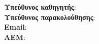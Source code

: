 \begin{titlepage}
    \vspace{1em}
    \hspace{4ex}
    \begin{minipage}[t]{0.8\textwidth} 
        \raggedright
        \textbf{Υπεύθυνος καθηγητής}: \advisor\\
        \textbf{Υπεύθυνος παρακολούθησης}: \advisorView\\
        \textbf{Email}: \mailauthor\\
        \textbf{ΑΕΜ}: \aem
    \end{minipage}\\

    \vspace{4cm}
    \begin{center}
        \textit{\hmeromhnia}\\
    \end{center}
    
    
\end{titlepage}